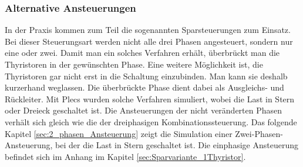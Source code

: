 \subsubsection{Alternative Ansteuerungen}\label{Spar-Ansteuerung}
In der Praxis kommen zum Teil die sogenannten Sparsteuerungen zum Einsatz. Bei dieser Steuerungsart werden nicht alle drei Phasen angesteuert, sondern nur eine oder zwei. Damit man ein solches Verfahren erhält, überbrückt man die Thyristoren in der gewünschten Phase. Eine weitere Möglichkeit ist, die Thyristoren gar nicht erst in die Schaltung einzubinden. Man kann sie deshalb kurzerhand weglassen. Die überbrückte Phase dient dabei als Ausgleichs- und Rückleiter. Mit Plecs wurden solche Verfahren simuliert, wobei die Last in Stern oder Dreieck geschaltet ist. Die Ansteuerungen der nicht veränderten Phasen verhält sich gleich wie die der dreiphasigen Kombinationssteuerung. Das folgende Kapitel \ref{sec:2_phasen_Ansteuerung} zeigt die Simulation einer Zwei-Phasen-Ansteuerung, bei der die Last in Stern geschaltet ist. Die einphasige Ansteuerung befindet sich im Anhang im Kapitel \ref{sec:Sparvariante_1Thyristor}.





